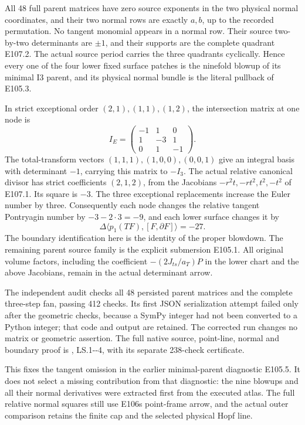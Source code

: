 All 48 full parent matrices have zero source exponents in the two physical normal coordinates, and their two normal rows are exactly \(a,b\), up to the recorded permutation. No tangent monomial appears in a normal row. Their source two-by-two determinants are \(\pm1\), and their supports are the complete quadrant E107.2. The actual source period carries the three quadrants cyclically. Hence every one of the four lower fixed surface patches is the ninefold blowup of its minimal I3 parent, and its physical normal bundle is the literal pullback of E105.3.

In strict exceptional order \((2,1),(1,1),(1,2)\), the intersection matrix at one node is
\[
 I_E=\begin{pmatrix}-1&1&0\\1&-3&1\\0&1&-1\end{pmatrix}.
 \tag{E107.3}
\]
The total-transform vectors \((1,1,1),(1,0,0),(0,0,1)\) give an integral basis with determinant \(-1\), carrying this matrix to \(-I_3\). The actual relative canonical divisor has strict coefficients \((2,1,2)\), from the Jacobians
\(-r^2t,-rt^2,t^2,-t^2\) of E107.1. Its square is \(-3\). The three exceptional replacements increase the Euler number by three. Consequently each node changes the relative tangent Pontryagin number by \(-3-2\cdot3=-9\), and each lower surface changes it by
\[
                \Delta\langle p_1(TF),[F,\partial F]\rangle=-27.
 \tag{E107.4}
\]
The boundary identification here is the identity of the proper blowdown. The remaining parent source family is the explicit submersion E105.1. All original volume factors, including the coefficient \(-(2J_{ts}/a_T)P\) in the lower chart and the above Jacobians, remain in the actual determinant arrow.

The independent audit  checks all 48 persisted parent matrices and the complete three-step fan, passing 412 checks. Its first JSON serialization attempt failed only after the geometric checks, because a SymPy integer had not been converted to a Python integer; that code and output are retained. The corrected run changes no matrix or geometric assertion. The full native source, point-line, normal and boundary proof is , LS.1-\/-4, with its separate 238-check certificate.

This fixes the tangent omission in the earlier minimal-parent diagnostic E105.5. It does not select a missing contribution from that diagnostic: the nine blowups and all their normal derivatives were extracted first from the executed atlas. The full relative normal squares still use E106\textquotesingle s point-frame arrow, and the actual outer comparison retains the finite cap and the selected physical Hopf line.

